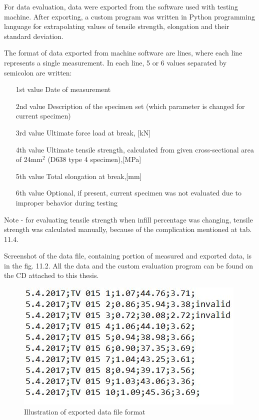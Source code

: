 \documentclass[a4paper, 11pt, reqno]{report}
\begin{document}
For data evaluation, data were exported from the software used with testing machine. After exporting, a custom program was written in Python programming language for extrapolating values of tensile strength, elongation and their standard deviation.

	The format of data exported from machine software are lines, where each line represents a single measurement. In each line, 5 or 6 values separated by semicolon are written:
\setlength{\leftmargini}{50pt}
\begin{itemize}
\item[1st value]Date of measurement
\item[2nd value]Description of the specimen set (which parameter is changed for current specimen)
\item[3rd value]Ultimate force load at break, [kN]
\item[4th value]Ultimate tensile strength, calculated from given cross-sectional area of 24mm$^2$ (D638 type 4 specimen),[MPa]
\item[5th value]Total elongation at break,[mm]
\item[6th value]Optional, if present, current specimen was not evaluated due to improper behavior during testing
\end{itemize}

Note - for evaluating tensile strength when infill percentage was changing, tensile strength was calculated manually, because of the complication mentioned at tab. 11.4.

	Screenshot of the data file, containing portion of measured and exported data, is in the fig. 11.2. All the data and the custom evaluation program can be found on the CD attached to this thesis.
\begin{figure}[h]
\centering
\includegraphics[scale=1]{tensileData}
\caption{Illustration of exported data file format}
\end{figure}
\end{document}
